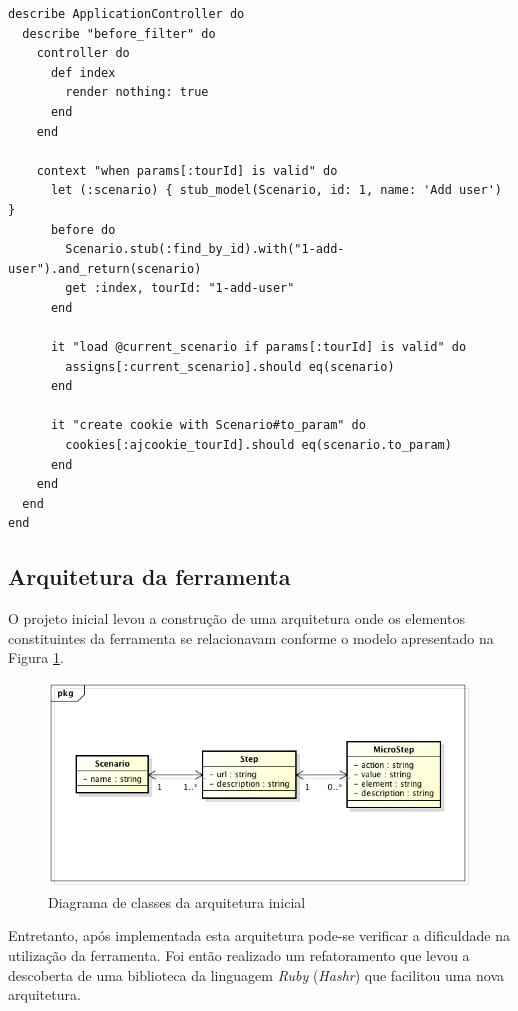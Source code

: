 {\singlespace
\begin{lstlisting}[caption=Teste unitário de \textit{controller},label={lst:codigo35}]
describe ApplicationController do
  describe "before_filter" do
    controller do
      def index
        render nothing: true
      end
    end

    context "when params[:tourId] is valid" do
      let (:scenario) { stub_model(Scenario, id: 1, name: 'Add user') }
      before do
        Scenario.stub(:find_by_id).with("1-add-user").and_return(scenario)
        get :index, tourId: "1-add-user"
      end

      it "load @current_scenario if params[:tourId] is valid" do
        assigns[:current_scenario].should eq(scenario)
      end

      it "create cookie with Scenario#to_param" do
        cookies[:ajcookie_tourId].should eq(scenario.to_param)
      end
    end
  end
end
\end{lstlisting}
}

\subsection{Arquitetura da ferramenta}

O projeto inicial levou a construção de uma arquitetura onde os elementos constituintes da ferramenta se relacionavam conforme o modelo apresentado na Figura \ref{figura_32}.

\begin{figure}[ht]
    \centering
    \includegraphics[width=0.9 \textwidth]{figuras/figura_32}
    \caption{Diagrama de classes da arquitetura inicial}
    \label{figura_32}
\end{figure}

Entretanto, após implementada esta arquitetura pode-se verificar a dificuldade na utilização da ferramenta. Foi então realizado um refatoramento que levou a descoberta de uma biblioteca da linguagem \textit{Ruby} (\textit{Hashr}) que facilitou uma nova arquitetura.

